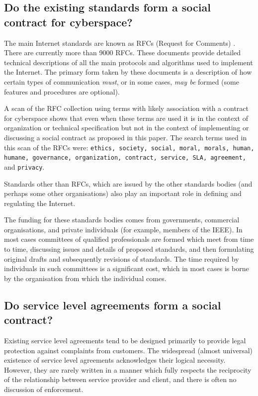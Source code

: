 \subsection{Do the existing standards form a social contract for cyberspace?}

The main Internet standards are known as RFCs (Request for Comments) \cite{RFCs}.
There are currently more than 9000 RFCs. These documents provide detailed
technical descriptions of all the main protocols and algorithms used to
implement the Internet. The primary form taken by these documents is a description
of how certain types of communication {\em must}, or in some cases, {\em may be} 
formed (some features and procedures are optional).

A scan of the RFC collection using terms with likely association with a
contract for cyberspace shows that even when these terms are used it
is in the context of organization or technical specification but not
in the context of implementing or discussing a social contract as proposed in this 
paper. The search terms used in this scan of the RFCs were: {\tt ethics,
society, social, moral, morals, human, humane, governance, organization,
contract, service, SLA, agreement,} and {\tt privacy}.

Standards other than RFCs, which are issued by the other standards bodies \cite{ITU,IEEE,ETSI,ISO}
(and perhaps some other organisations) also play an important role in defining and
regulating the Internet.

The funding for these standards bodies comes from governments, commercial organisations,
and private individuals (for example, members of the IEEE). In most cases committees of
qualified professionals are formed which meet from time to time, discussing
issues and details of proposed standards, and then formulating original drafts and 
subsequently revisions of standards. The time required by individuals in such committees 
is a significant cost, which in most cases is borne by the organisation from which
the individual comes.

\subsection{Do service level agreements form a social contract?}\label{slasec}

Existing service level agreements tend to be designed primarily
to provide legal protection against complaints from customers. The widespread (almost
universal) existence of service level agreements acknowledges their logical
necessity. However, they are rarely written in a manner which fully respects
the reciprocity of the relationship between service provider and client, 
and there is often no discussion of enforcement.



